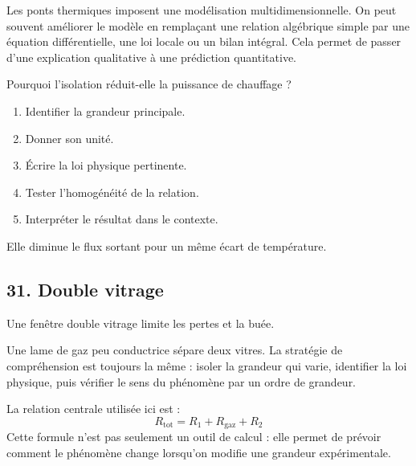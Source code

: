 \documentclass[11pt,a4paper]{article}
\begin{document}
\begin{approfondissementbox}
Les ponts thermiques imposent une modélisation multidimensionnelle.
On peut souvent améliorer le modèle en remplaçant une relation algébrique simple par une équation différentielle, une loi locale ou un bilan intégral. Cela permet de passer d'une explication qualitative à une prédiction quantitative.
\end{approfondissementbox}

\begin{exercicebox}
Pourquoi l'isolation réduit-elle la puissance de chauffage ?
\begin{enumerate}
  \item Identifier la grandeur principale.
  \item Donner son unité.
  \item Écrire la loi physique pertinente.
  \item Tester l'homogénéité de la relation.
  \item Interpréter le résultat dans le contexte.
\end{enumerate}
\end{exercicebox}

\begin{corrigebox}[Indication]
Elle diminue le flux sortant pour un même écart de température.
\end{corrigebox}


\subsection{31. Double vitrage}

\begin{exemplebox}
Une fenêtre double vitrage limite les pertes et la buée.
\end{exemplebox}

\begin{methodebox}
Une lame de gaz peu conductrice sépare deux vitres.
La stratégie de compréhension est toujours la même : isoler la grandeur qui varie, identifier la loi physique, puis vérifier le sens du phénomène par un ordre de grandeur.
\end{methodebox}

\begin{theorembox}
La relation centrale utilisée ici est :
\[
R_{\mathrm{tot}}=R_1+R_{\mathrm{gaz}}+R_2
\]
Cette formule n'est pas seulement un outil de calcul : elle permet de prévoir comment le phénomène change lorsqu'on modifie une grandeur expérimentale.
\end{theorembox}
\end{document}
